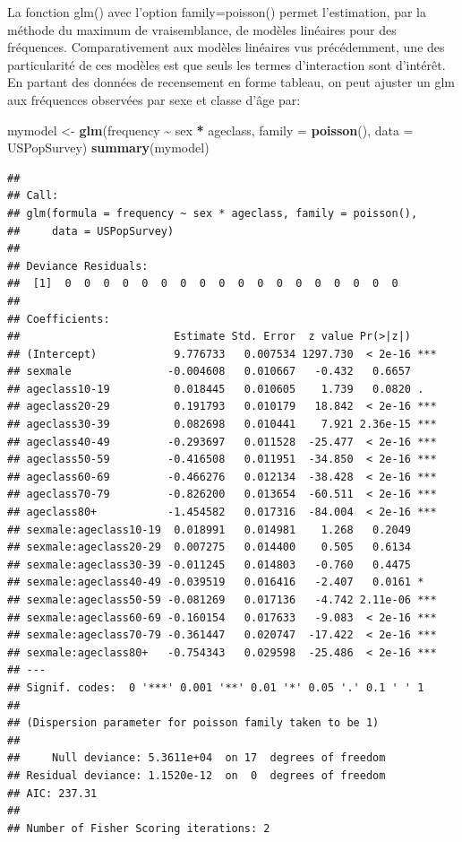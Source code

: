 \documentclass[
  12pt,
]{book}
\newenvironment{Shaded}{\begin{snugshade}}{\end{snugshade}}
\newcommand{\DataTypeTok}[1]{\textcolor[rgb]{0.13,0.29,0.53}{#1}}
\newcommand{\KeywordTok}[1]{\textcolor[rgb]{0.13,0.29,0.53}{\textbf{#1}}}
\newcommand{\NormalTok}[1]{#1}
\newcommand{\OperatorTok}[1]{\textcolor[rgb]{0.81,0.36,0.00}{\textbf{#1}}}
\newcommand{\StringTok}[1]{\textcolor[rgb]{0.31,0.60,0.02}{#1}}
\begin{document}
La fonction glm() avec l'option family=poisson() permet l'estimation, par la méthode du maximum de vraisemblance, de modèles linéaires pour des fréquences. Comparativement aux modèles linéaires vus précédemment, une des particularité de ces modèles est que seuls les termes d'interaction sont d'intérêt. En partant des données de recensement en forme tableau, on peut ajuster un glm aux fréquences observées par sexe et classe d'âge par:

\begin{Shaded}
\begin{Highlighting}[]
\NormalTok{mymodel \textless{}{-}}\StringTok{ }\KeywordTok{glm}\NormalTok{(frequency }\OperatorTok{\textasciitilde{}}\StringTok{ }\NormalTok{sex }\OperatorTok{*}\StringTok{ }\NormalTok{ageclass, }\DataTypeTok{family =} \KeywordTok{poisson}\NormalTok{(), }\DataTypeTok{data =}\NormalTok{ USPopSurvey)}
\KeywordTok{summary}\NormalTok{(mymodel)}
\end{Highlighting}
\end{Shaded}

\begin{verbatim}
## 
## Call:
## glm(formula = frequency ~ sex * ageclass, family = poisson(), 
##     data = USPopSurvey)
## 
## Deviance Residuals: 
##  [1]  0  0  0  0  0  0  0  0  0  0  0  0  0  0  0  0  0  0
## 
## Coefficients:
##                        Estimate Std. Error  z value Pr(>|z|)    
## (Intercept)            9.776733   0.007534 1297.730  < 2e-16 ***
## sexmale               -0.004608   0.010667   -0.432   0.6657    
## ageclass10-19          0.018445   0.010605    1.739   0.0820 .  
## ageclass20-29          0.191793   0.010179   18.842  < 2e-16 ***
## ageclass30-39          0.082698   0.010441    7.921 2.36e-15 ***
## ageclass40-49         -0.293697   0.011528  -25.477  < 2e-16 ***
## ageclass50-59         -0.416508   0.011951  -34.850  < 2e-16 ***
## ageclass60-69         -0.466276   0.012134  -38.428  < 2e-16 ***
## ageclass70-79         -0.826200   0.013654  -60.511  < 2e-16 ***
## ageclass80+           -1.454582   0.017316  -84.004  < 2e-16 ***
## sexmale:ageclass10-19  0.018991   0.014981    1.268   0.2049    
## sexmale:ageclass20-29  0.007275   0.014400    0.505   0.6134    
## sexmale:ageclass30-39 -0.011245   0.014803   -0.760   0.4475    
## sexmale:ageclass40-49 -0.039519   0.016416   -2.407   0.0161 *  
## sexmale:ageclass50-59 -0.081269   0.017136   -4.742 2.11e-06 ***
## sexmale:ageclass60-69 -0.160154   0.017633   -9.083  < 2e-16 ***
## sexmale:ageclass70-79 -0.361447   0.020747  -17.422  < 2e-16 ***
## sexmale:ageclass80+   -0.754343   0.029598  -25.486  < 2e-16 ***
## ---
## Signif. codes:  0 '***' 0.001 '**' 0.01 '*' 0.05 '.' 0.1 ' ' 1
## 
## (Dispersion parameter for poisson family taken to be 1)
## 
##     Null deviance: 5.3611e+04  on 17  degrees of freedom
## Residual deviance: 1.1520e-12  on  0  degrees of freedom
## AIC: 237.31
## 
## Number of Fisher Scoring iterations: 2
\end{verbatim}
\end{document}
